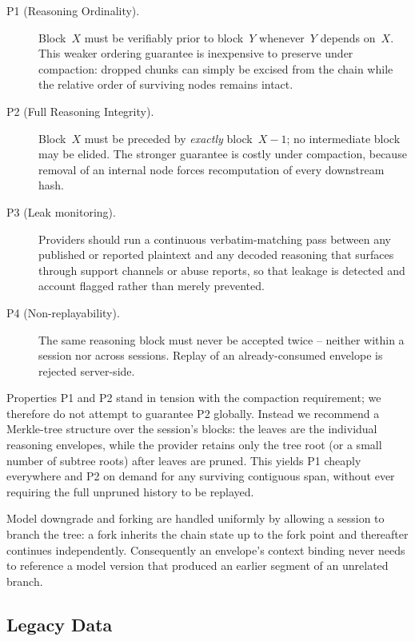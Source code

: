 \begin{description}
\item[P1 (Reasoning Ordinality).]
  Block~$X$ must be verifiably prior to block~$Y$ whenever~$Y$ depends
  on~$X$.  This weaker ordering guarantee is inexpensive to preserve under
  compaction: dropped chunks can simply be excised from the chain while
  the relative order of surviving nodes remains intact.

\item[P2 (Full Reasoning Integrity).]
  Block~$X$ must be preceded by \emph{exactly} block~$X{-}1$; no
  intermediate block may be elided.  The stronger guarantee is costly
  under compaction, because removal of an internal node forces
  recomputation of every downstream hash.

\item[P3 (Leak monitoring).]
  Providers should run a continuous verbatim-matching pass between any
  published or reported plaintext and any decoded reasoning that surfaces
  through support channels or abuse reports, so that leakage is detected and account flagged rather than merely prevented.

\item[P4 (Non-replayability).]
  The same reasoning block must never be accepted twice -- neither within
  a session nor across sessions.  Replay of an already-consumed envelope
  is rejected server-side.
\end{description}

Properties P1 and P2 stand in tension with the compaction requirement;
we therefore do not attempt to guarantee P2 globally.  Instead we recommend
a Merkle-tree structure over the session's blocks: the leaves are the
individual reasoning envelopes, while the provider retains only the tree
root (or a small number of subtree roots) after leaves are pruned.
This yields P1 cheaply everywhere and P2 on demand for any surviving
contiguous span, without ever requiring the full unpruned history to be
replayed.

Model downgrade and forking are handled uniformly by allowing a session
to branch the tree: a fork inherits the chain state up to the fork point
and thereafter continues independently. Consequently an envelope's
context binding never needs to reference a model version that produced
an earlier segment of an unrelated branch.

\subsection{Legacy Data}
\label{sec:legacy}

